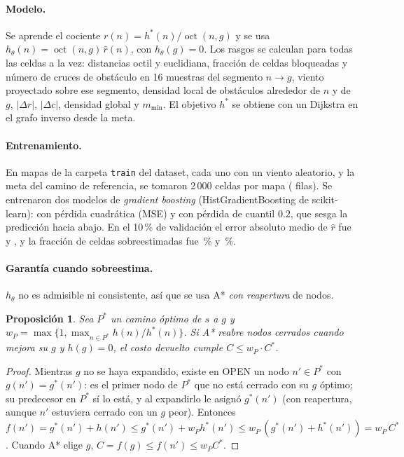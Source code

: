 \documentclass[11pt]{article}
\newtheorem{prop}{Proposición}
\theoremstyle{remark}
\newcommand{\oct}{\operatorname{oct}}
\begin{document}
\paragraph{Modelo.} Se aprende el cociente $r(n)=h^*(n)/\oct(n,g)$ y se usa
$h_\theta(n)=\oct(n,g)\,\hat r(n)$, con $h_\theta(g)=0$. Los rasgos se calculan para todas las
celdas a la vez: distancias octil y euclidiana, fracción de celdas bloqueadas y número de cruces de
obstáculo en 16 muestras del segmento $n\to g$, viento proyectado sobre ese segmento, densidad local
de obstáculos alrededor de $n$ y de $g$, $|\Delta r|$, $|\Delta c|$, densidad global y $m_{\min}$.
El objetivo $h^*$ se obtiene con un Dijkstra en el grafo inverso desde la meta.

\paragraph{Entrenamiento.} En \hMapas{} mapas de la carpeta \texttt{train} del dataset, cada uno con un
viento aleatorio, y la meta del camino de referencia, se tomaron 2\,000 celdas por mapa (\hFilas{} filas).
Se entrenaron dos modelos de \emph{gradient boosting} (HistGradientBoosting de scikit-learn):
con pérdida cuadrática (MSE) y con pérdida de cuantil $0.2$, que sesga la predicción hacia abajo.
En el 10\,\% de validación el error absoluto medio de $\hat r$ fue \hMaeMse{} y \hMaeQ{}, y la fracción
de celdas sobreestimadas fue \hSobreMse\,\% y \hSobreQ\,\%.

\paragraph{Garantía cuando sobreestima.} $h_\theta$ no es admisible ni consistente, así que se usa
A* \emph{con reapertura} de nodos.

\begin{prop}\label{prop:w}
Sea $P^*$ un camino óptimo de $s$ a $g$ y $w_P=\max\{1,\max_{n\in P^*}h(n)/h^*(n)\}$. Si A* reabre
nodos cerrados cuando mejora su $g$ y $h(g)=0$, el costo devuelto cumple $C\le w_P\cdot C^*$.
\end{prop}
\begin{proof}
Mientras $g$ no se haya expandido, existe en OPEN un nodo $n'\in P^*$ con $g(n')=g^*(n')$: es el
primer nodo de $P^*$ que no está cerrado con su $g$ óptimo; su predecesor en $P^*$ sí lo está, y al
expandirlo le asignó $g^*(n')$ (con reapertura, aunque $n'$ estuviera cerrado con un $g$ peor).
Entonces $f(n')=g^*(n')+h(n')\le g^*(n')+w_Ph^*(n')\le w_P\,(g^*(n')+h^*(n'))=w_P\,C^*$. Cuando A*
elige $g$, $C=f(g)\le f(n')\le w_P C^*$.
\end{proof}
\end{document}
